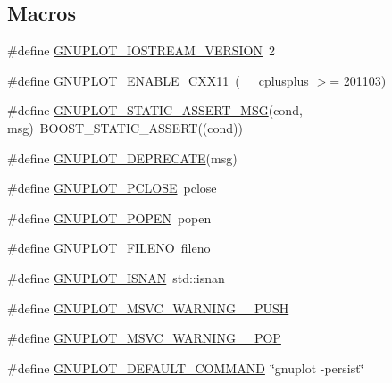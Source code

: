\subsection*{Macros}
\begin{DoxyCompactItemize}
\item 
\#define \hyperlink{gnuplot-iostream_8h_ab3ce4a7287aefeb9af2345e08cb2d5c6}{G\+N\+U\+P\+L\+O\+T\+\_\+\+I\+O\+S\+T\+R\+E\+A\+M\+\_\+\+V\+E\+R\+S\+I\+ON}~2
\item 
\#define \hyperlink{gnuplot-iostream_8h_aff01a99842ed9eb01a166d4bf19543c9}{G\+N\+U\+P\+L\+O\+T\+\_\+\+E\+N\+A\+B\+L\+E\+\_\+\+C\+X\+X11}~(\+\_\+\+\_\+cplusplus $>$= 201103)
\item 
\#define \hyperlink{gnuplot-iostream_8h_a763d85d6a998475c41e5bea11e6f0a16}{G\+N\+U\+P\+L\+O\+T\+\_\+\+S\+T\+A\+T\+I\+C\+\_\+\+A\+S\+S\+E\+R\+T\+\_\+\+M\+SG}(cond,  msg)~B\+O\+O\+S\+T\+\_\+\+S\+T\+A\+T\+I\+C\+\_\+\+A\+S\+S\+E\+RT((cond))
\item 
\#define \hyperlink{gnuplot-iostream_8h_aceaee9cbe0b7786c1ee8aa2e8b79ed1a}{G\+N\+U\+P\+L\+O\+T\+\_\+\+D\+E\+P\+R\+E\+C\+A\+TE}(msg)
\item 
\#define \hyperlink{gnuplot-iostream_8h_aed027791e656970e6de95b047dc375b1}{G\+N\+U\+P\+L\+O\+T\+\_\+\+P\+C\+L\+O\+SE}~pclose
\item 
\#define \hyperlink{gnuplot-iostream_8h_a92922430eb3df3ace3b18c75b91a0ab8}{G\+N\+U\+P\+L\+O\+T\+\_\+\+P\+O\+P\+EN}~popen
\item 
\#define \hyperlink{gnuplot-iostream_8h_abcc0f8f4d67f147c013bb33b55dc3a16}{G\+N\+U\+P\+L\+O\+T\+\_\+\+F\+I\+L\+E\+NO}~fileno
\item 
\#define \hyperlink{gnuplot-iostream_8h_ac10f83c29b94951000138a0ab2054956}{G\+N\+U\+P\+L\+O\+T\+\_\+\+I\+S\+N\+AN}~std\+::isnan
\item 
\#define \hyperlink{gnuplot-iostream_8h_aef2d72925bdeb9f505df49edbf7579bf}{G\+N\+U\+P\+L\+O\+T\+\_\+\+M\+S\+V\+C\+\_\+\+W\+A\+R\+N\+I\+N\+G\+\_\+\_\+\+P\+U\+SH}
\item 
\#define \hyperlink{gnuplot-iostream_8h_a4429193ca854af851cec4220c2d9102e}{G\+N\+U\+P\+L\+O\+T\+\_\+\+M\+S\+V\+C\+\_\+\+W\+A\+R\+N\+I\+N\+G\+\_\+\_\+\+P\+OP}
\item 
\#define \hyperlink{gnuplot-iostream_8h_afe4b1cc99e87d3bb8bbb07280db4b697}{G\+N\+U\+P\+L\+O\+T\+\_\+\+D\+E\+F\+A\+U\+L\+T\+\_\+\+C\+O\+M\+M\+A\+ND}~\char`\"{}gnuplot -\/persist\char`\"{}
\end{DoxyCompactItemize}
